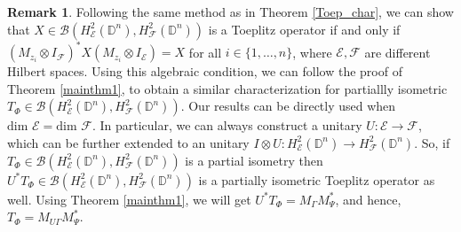 \documentclass[12pt]{amsart}
\theoremstyle{definition}
\newtheorem{rem}{Remark}[section]
\newcommand{\D}{\mathbb{D}}
\newcommand{\1}{{\mbox{\bf 1}}}
\newcommand{\clb}{\mathcal{B}}
\newcommand{\cle}{\mathcal{E}}
\newcommand{\clf}{\mathcal{F}}
\newcommand{\raro}{\rightarrow}
\begin{document}
\begin{rem}
Following the same method as in Theorem \ref{Toep_char}, we can show that $X \in \clb(H_{\cle}^2(\D^n), H_{\clf}^2(\D^n))$ is a Toeplitz operator if and only if $(M_{z_i} \otimes I_{\clf})^* X (M_{z_i} \otimes I_{\cle}) = X$ for all $i \in \{1,\ldots,n\}$, where $\cle, \clf$ are different Hilbert spaces. Using this algebraic condition, we can follow the proof of Theorem \ref{mainthm1}, to obtain a similar characterization for partiallly isometric $T_{\Phi} \in \clb(H_{\cle}^2(\D^n), H_{\clf}^2(\D^n))$. Our results can be directly used when $\mbox{dim } \cle = \mbox{dim } \clf$. In particular, we can always construct a unitary $U: \cle \raro \clf$, which can be further extended to an unitary $I \otimes U: H_{\cle}^2(\D^n) \raro H_{\clf}^2(\D^n)$. So, if $T_{\Phi} \in \clb(H_{\cle}^2(\D^n), H_{\clf}^2(\D^n))$ is a partial isometry then $U^* T_{\Phi} \in \clb(H_{\cle}^2(\D^n), H_{\clf}^2(\D^n))$ is a partially isometric Toeplitz operator as well. Using Theorem \ref{mainthm1}, we will get $U^* T_{\Phi} = M_{\Gamma} M_{\Psi}^*$, and hence, $T_{\Phi} = M_{U \Gamma} M_{\Psi}^*$.
\end{rem}
\end{document}
